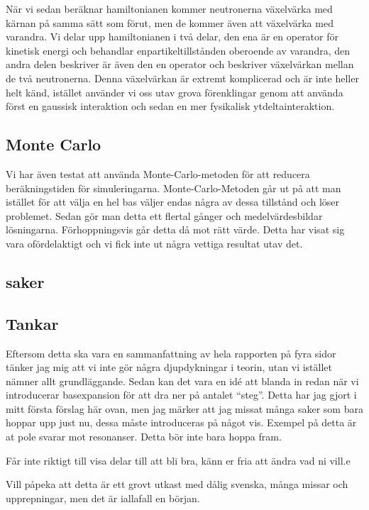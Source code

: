 \documentclass[12pt,a4paper]{article}
\begin{document}
När vi sedan beräknar hamiltonianen kommer neutronerna växelvärka med kärnan på samma sätt som förut, men de kommer även att växelvärka med varandra.
Vi delar upp hamiltonianen i två delar, den ena är en operator för kinetisk energi och behandlar enpartikeltillstånden oberoende av varandra, den andra delen beskriver är även den en operator och beskriver växelvärkan mellan de två neutronerna.
Denna växelvärkan är extremt komplicerad och är inte heller helt känd, istället använder vi oss utav grova förenklingar genom att använda först en gaussisk interaktion och sedan en mer fysikalisk ytdeltainteraktion.



\subsection{Monte Carlo}
Vi har även testat att använda Monte-Carlo-metoden för att reducera beräkningstiden för simuleringarna.
Monte-Carlo-Metoden går ut på att man istället för att välja en hel bas väljer endas några av dessa tillstånd och löser problemet.
Sedan gör man detta ett flertal gånger och medelvärdesbildar lösningarna.
Förhoppningsvis går detta då mot rätt värde.
Detta har visat sig vara ofördelaktigt och vi fick inte ut några vettiga resultat utav det.

\subsection{saker}

\subsection{Tankar}
Eftersom detta ska vara en sammanfattning av hela rapporten på fyra sidor tänker jag mig att vi inte gör några djupdykningar i teorin, utan vi istället nämner allt grundläggande. Sedan kan det vara en idé att blanda in  redan när vi introducerar basexpansion för att dra ner på antalet ``steg''. Detta har jag gjort i mitt första förslag här ovan, men jag märker att jag missat många saker som bara hoppar upp just nu, dessa måste introduceras på något vis. Exempel på detta är at pole svarar mot resonanser. Detta bör inte bara hoppa fram.

Får inte riktigt till visa delar till att bli bra, känn er fria att ändra vad ni vill.e

Vill påpeka att detta är ett grovt utkast med dålig svenska, många missar och upprepningar, men det är iallafall en början.
\end{document}
